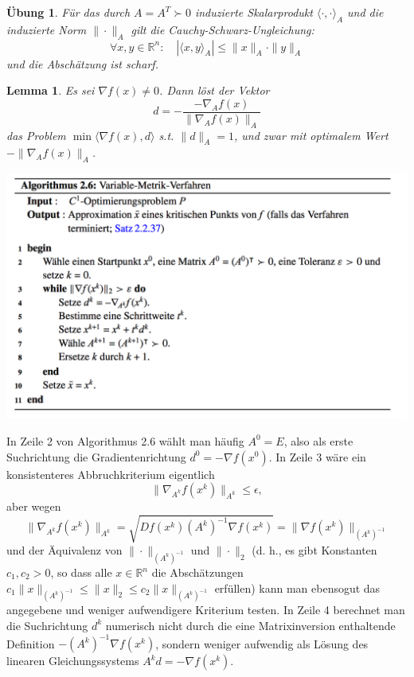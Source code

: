 \documentclass[11pt]{scrreprt}
\newcounter{thm}
\theoremstyle{thmstyle}
\numberwithin{thm}{section}
\newtheorem{lemma}[thm]{Lemma}
\newtheorem{uebung}[thm]{Übung}
\begin{document}
\begin{uebung}
	Für das durch $A = A^T \succ 0$ induzierte Skalarprodukt $\langle \cdot, \cdot \rangle_A$ und die induzierte Norm $\| \cdot \|_A$ gilt die Cauchy-Schwarz-Ungleichung:
		$$ \forall x,y \in \mathbb{R}^n: \quad \left| \langle x, y \rangle_A \right| \leq \| x \|_A \cdot \| y \|_A $$
	und die Abschätzung ist scharf.
\end{uebung}

\begin{lemma}
	Es sei $\nabla f(x) \neq 0$. Dann löst der Vektor 
	$$ d = - \frac{- \nabla_A f(x)}{\| \nabla_A f(x) \|_A} $$
	das Problem $\min \langle \nabla f(x), d \rangle$ s.t. $\| d \|_A = 1$, und zwar mit optimalem Wert $- \| \nabla_A f(x) \|_A$.
\end{lemma}

\begin{center}
	\includegraphics[scale=0.5]{a26}
\end{center}

In Zeile 2 von Algorithmus 2.6 wählt man häufig $A^0 = E$, also als erste Suchrichtung die Gradientenrichtung $d^0 = - \nabla f(x^0)$. In Zeile 3 wäre ein konsistenteres Abbruchkriterium eigentlich 
		$$ \| \nabla_{A^{k}} f(x^k) \|_{A^k} \leq \epsilon, $$
	aber wegen
		$$ \| \nabla_{A^{k}} f(x^k) \|_{A^k} = \sqrt{D f(x^k) (A^k)^{-1} \nabla f(x^k)} = \| \nabla f(x^k) \|_{(A^k)^{-1}} $$
	und der Äquivalenz von $\| \cdot \|_{(A^{k})^{-1}}$ und $\| \cdot \|_2$ (d. h., es gibt Konstanten $c_1, c_2 > 0$, so dass alle $x \in \mathbb{R}^n$ die Abschätzungen $c_1 \| x \|_{(A^{k})^{-1}}\leq \| x \|_2 \leq c_2 \| x \|_{(A^k)^{-1}}$ erfüllen) kann man ebensogut das angegebene und weniger aufwendigere Kriterium testen. In Zeile 4 berechnet man die Suchrichtung $d^k$ numerisch nicht durch die eine Matrixinversion enthaltende Definition $-(A^k)^{-1} \nabla f(x^k)$, sondern weniger aufwendig als Lösung des linearen Gleichungssystems $A^k d = - \nabla f(x^k)$. ~\bigskip
\end{document}
